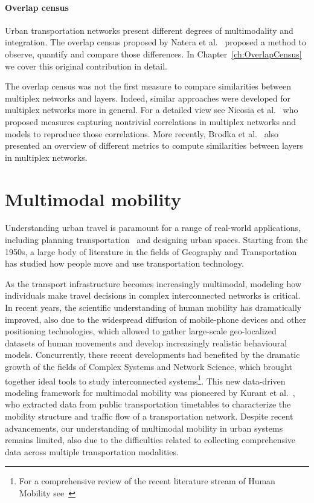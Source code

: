 \paragraph*{Overlap census}\label{overlap}
Urban transportation networks present different degrees of multimodality and integration. The overlap census proposed by Natera et al.~\cite{natera2020multimodal} proposed a method to observe, quantify and compare those differences. In Chapter~\ref{ch:OverlapCensus} we cover this original contribution in detail.

The overlap census was not the first measure to compare similarities between multiplex networks and layers. Indeed, similar approaches were developed for multiplex networks more in general. For a detailed view see Nicosia et al.~\cite{nicosia2015measuring} who proposed measures capturing nontrivial correlations in multiplex networks and models to reproduce those correlations. More recently, Brodka et al.~\cite{brodka2017similarity} also presented an overview of different metrics to compute similarities between layers in multiplex networks. 


\section{Multimodal mobility}\label{sec:multimodalmobility}

Understanding urban travel is paramount for a range of real-world applications, including planning transportation~\cite{patriksson2015traffic} and designing urban spaces. Starting from the 1950s, a large body of literature in the fields of Geography and Transportation has studied how people move and use transportation technology. 

As the transport infrastructure becomes increasingly multimodal, modeling how individuals make travel decisions in complex interconnected networks is critical. In recent years, the scientific understanding of human mobility has dramatically improved, also due to the widespread diffusion of mobile-phone devices and other positioning technologies, which allowed to gather large-scale geo-localized datasets of human movements and develop increasingly realistic behavioural models. Concurrently, these recent developments had benefited by the dramatic growth of the fields of Complex Systems and Network Science, which brought together ideal tools to study interconnected systems\footnote{For a comprehensive review of the recent literature stream of Human Mobility see~\cite{barbosa2018human}}. This new data-driven modeling framework for multimodal mobility was pioneered by Kurant et al.~\cite{kurant2006extraction}, who extracted data from public transportation timetables to characterize the mobility structure and traffic flow of a transportation network. Despite recent advancements, our understanding of multimodal mobility in urban systems remains limited, also due to the difficulties related to collecting comprehensive data across multiple transportation modalities. 


